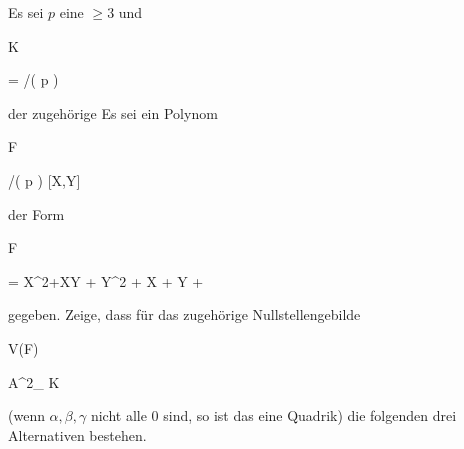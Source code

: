 {


Es sei $p$ eine
$\geq 3$ und


\mavergleichskette


{\vergleichskette


{ K
}


{ = }{ \Z/( p )
}


{  }{
}


{    }{
}


{   }{
}


}
{}{}{}
der zugehörige
Es sei ein Polynom


\mavergleichskette


{\vergleichskette


{ F
}


{ \in }{ \Z/( p ) [X,Y]
}


{  }{
}


{    }{
}


{   }{
}


}
{}{}{}
der Form


\mavergleichskettedisp


{\vergleichskette


{ F
}


{ =} { \alpha X^2+\beta XY + \gamma Y^2 + \delta X + \epsilon Y + \eta
}


{ } {
}


{ } {
}


{ } {
}


}
{}{}{}
gegeben. Zeige, dass für das zugehörige Nullstellengebilde


\mavergleichskette


{\vergleichskette


{ V(F)
}


{ \subseteq }{ {\mathbb A}^{2}_{ K }
}


{  }{
}


{    }{
}


{   }{
}


}
{}{}{}

(wenn $\alpha, \beta, \gamma$ nicht alle $0$ sind, so ist das eine Quadrik) die folgenden drei Alternativen bestehen.
}
